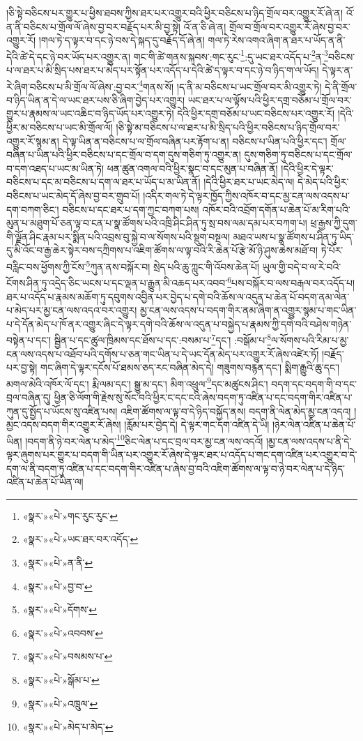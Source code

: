 །ཅི་སྟེ་བཅིངས་པར་གྱུར་པ་ཕྱིས་ཐབས་ཀྱིས་ཐར་པར་འགྱུར་བའི་ཕྱིར་བཅིངས་པ་ཉིད་གྲོལ་བར་འགྱུར་རོ་ཞེ་ན། འོ་ན་ནི་བཅིངས་པ་གྲོལ་ལོ་ཞེས་བྱ་བར་བརྗོད་པར་མི་བྱ་སྟེ། འོ་ན་ཅི་ཞེ་ན། གྲོལ་བ་གྲོལ་བར་འགྱུར་རོ་ཞེས་བྱ་བར་འགྱུར་རོ། །གལ་ཏེ་ད་ལྟར་བ་དང་ཉེ་བས་དེ་སྐད་དུ་བརྗོད་དོ་ཞེ་ན། གལ་ཏེ་རེས་འགའ་ཞིག་ན་ཐར་པ་ཡོད་ན་ནི་དེའི་ཚེ་དེ་དང་ཉེ་བར་ཡོད་པར་འགྱུར་ན། གང་གི་ཚེ་གནས་སྐབས་:གང་རུང་\footnote{«སྣར་»«པེ་»གང་རུང་རུང་}:དུ་ཡང་ཐར་འདོད་པ་\footnote{«སྣར་»«པེ་»ཡང་ཐར་བར་འདོད་}ན་\footnote{«སྣར་»«པེ་»ན་ནི་}བཅིངས་པ་ལ་ཐར་པ་མི་སྲིད་པས་ཐར་པ་མེད་པར་སྟོན་པར་འདོད་པ་དེའི་ཚེ་ད་ལྟར་བ་དང་ཉེ་བ་ཉིད་ག་ལ་ཡོད། དེ་ལྟར་ན་རེ་ཞིག་བཅིངས་པ་མི་གྲོལ་ལོ་ཞེས་:བྱ་བར་\footnote{«སྣར་»«པེ་»བྱ་བ་}གནས་སོ། །ད་ནི་མ་བཅིངས་པ་ཡང་གྲོལ་བར་མི་འགྱུར་ཏེ། དེ་ནི་གྲོལ་བ་ཉིད་ཡིན་ན་དེ་ལ་ཡང་ཐར་པས་ཅི་ཞིག་བྱེད་པར་འགྱུར། ཡང་ཐར་པ་ལ་ལྟོས་པའི་ཕྱིར་དགྲ་བཅོམ་པ་གྲོལ་བར་གྱུར་པ་རྣམས་ལ་ཡང་འཆིང་བ་ཉིད་ཡོད་པར་འགྱུར་ཏེ། དེའི་ཕྱིར་དགྲ་བཅོམ་པ་ཡང་བཅིངས་པར་འགྱུར་རོ། །དེའི་ཕྱིར་མ་བཅིངས་པ་ཡང་མི་གྲོལ་ལོ། །ཅི་སྟེ་མ་བཅིངས་པ་ལ་ཐར་པ་མི་སྲིད་པའི་ཕྱིར་བཅིངས་པ་ཉིད་གྲོལ་བར་འགྱུར་རོ་སྙམ་ན། དེ་ལྟ་ཡིན་ན་བཅིངས་པ་ལ་གྲོལ་བཞིན་པར་རྟོག་པ་ན། བཅིངས་པ་ཡིན་པའི་ཕྱིར་དང་། གྲོལ་བཞིན་པ་ཡིན་པའི་ཕྱིར་བཅིངས་པ་དང་གྲོལ་བ་དག་དུས་གཅིག་ཏུ་འགྱུར་ན། དུས་གཅིག་ཏུ་བཅིངས་པ་དང་གྲོལ་བ་དག་འཐད་པ་ཡང་མ་ཡིན་ཏེ། ཕན་ཚུན་འགལ་བའི་ཕྱིར་སྣང་བ་དང་མུན་པ་བཞིན་ནོ། །དེའི་ཕྱིར་དེ་ལྟར་བཅིངས་པ་དང་མ་བཅིངས་པ་དག་ལ་ཐར་པ་ཡོད་པ་མ་ཡིན་ནོ། །དེའི་ཕྱིར་ཐར་པ་ཡང་མེད་ལ། དེ་མེད་པའི་ཕྱིར་བཅིངས་པ་ཡང་མེད་དོ་ཞེས་བྱ་བར་གྲུབ་པོ། །འདིར་གལ་ཏེ་དེ་ལྟར་ཁྱོད་ཀྱིས་འཁོར་བ་དང་མྱ་ངན་ལས་འདས་པ་དག་བཀག་ཅིང་། བཅིངས་པ་དང་ཐར་པ་དག་ཀྱང་བཀག་པས། འཁོར་བའི་འབྲོག་དགོན་པ་ཆེན་པོ་མ་རིག་པའི་མུན་པ་མཐུག་པོ་ཅན་ལྟ་བ་ངན་པ་སྣ་ཚོགས་པའི་འཁྲི་ཤིང་ཤིན་ཏུ་སྲ་བས་ལམ་དམ་པར་བཀག་པ། ཕྲ་རྒྱས་ཀྱི་དུག་གི་ལྗོན་ཤིང་རྣམ་པར་སྨིན་པའི་འབྲས་བུ་སྐྱེ་བ་ལ་སོགས་པའི་སྡུག་བསྔལ། མཐའ་ཡས་པ་སྣ་ཚོགས་པ་ཤིན་ཏུ་ཡིད་དུ་མི་འོང་བ་རྒྱ་ཆེར་སྟེར་བས་དཀྲིགས་པ་འཇིག་ཚོགས་ལ་ལྟ་བའི་རི་ཆེན་པོ་རྩེ་མོ་ཉི་ཤུས་ཆེས་མཐོ་བ། ཏེ་པོར་བརླིང་བས་ཕྱོགས་ཀྱི་ངོས་\footnote{«སྣར་»«པེ་»དོགས་}ཀུན་ནས་བསྐོར་བ། སྲེད་པའི་ཆུ་ཀླུང་གི་འོབས་ཆེན་པོ། ཡུལ་གྱི་བདེ་བ་ལ་རེ་བའི་ངོགས་ཤིན་ཏུ་འདྲེད་ཅིང་ཡངས་པ་དང་ལྡན་པ་རྒྱུན་མི་འཆད་པར་འབབ་\footnote{«སྣར་»«པེ་»འབབས་}པས་བསྐོར་བ་ལས་བརྒལ་བར་འདོད་པ། ཐར་པ་འདོད་པ་རྣམས་མཆོག་ཏུ་དབུགས་འབྱིན་པར་བྱེད་པ་དགེ་བའི་ཆོས་ལ་འདུན་པ་ཆེན་པོ་བདག་ནམ་ལེན་པ་མེད་པར་མྱ་ངན་ལས་འདའ་བར་འགྱུར། མྱ་ངན་ལས་འདས་པ་བདག་གིར་ནམ་ཞིག་ན་འགྱུར་སྙམ་པ་གང་ཡིན་པ་དེ་དོན་མེད་པ་ཁོ་ནར་འགྱུར་ཞིང་དེ་ལྟར་དགེ་བའི་ཆོས་ལ་འདུན་པ་བསྐྱེད་པ་རྣམས་ཀྱི་དགེ་བའི་བཤེས་གཉེན་བསྟེན་པ་དང་། སྦྱིན་པ་དང་ཚུལ་ཁྲིམས་དང་ཐོས་པ་དང་:བསམ་པ་\footnote{«སྣར་»«པེ་»བསམས་པ་}དང་། :བསྒོམ་པ་\footnote{«སྣར་»«པེ་»སྒོམ་པ་}ལ་སོགས་པའི་རིམ་པ་མྱ་ངན་ལས་འདས་པ་འཐོབ་པའི་དགོས་པ་ཅན་གང་ཡིན་པ་དེ་ཡང་དོན་མེད་པར་འགྱུར་རོ་ཞེས་འཛེར་ཏོ། །བརྗོད་པར་བྱ་སྟེ། གང་ཞིག་དེ་ལྟར་དངོས་པོ་ཐམས་ཅད་རང་བཞིན་མེད་དེ། གཟུགས་བརྙན་དང་། སྨིག་རྒྱུའི་ཆུ་དང་། མགལ་མེའི་འཁོར་ལོ་དང་། རྨི་ལམ་དང་། སྒྱུ་མ་དང་། མིག་འཕྲུལ་\footnote{«སྣར་»«པེ་»འཁྲུལ་}དང་མཚུངས་ཤིང་། བདག་དང་བདག་གི་བ་དང་བྲལ་བཞིན་དུ། ཕྱིན་ཅི་ལོག་གི་རྗེས་སུ་སོང་བའི་ཕྱིར་ང་དང་ངའི་ཞེས་བདག་ཏུ་འཛིན་པ་དང་བདག་གིར་འཛིན་པ་ཀུན་དུ་སྤྱོད་པ་ཡོངས་སུ་འཛིན་པས། འཇིག་ཚོགས་ལ་ལྟ་བ་དེ་ཉིད་བསྐྱོད་ནས། བདག་ནི་ལེན་མེད་མྱ་ངན་འདའ། །མྱང་འདས་བདག་གིར་འགྱུར་རོ་ཞེས། །རློམ་པར་བྱེད་དེ། དེ་ལྟར་གང་དག་འཛིན་དེ་ཡི། །ཉེར་ལེན་འཛིན་པ་ཆེན་པོ་ཡིན། །བདག་ནི་ཉེ་བར་ལེན་པ་མེད་\footnote{«སྣར་»«པེ་»མེད་པ་མེད་}ཅིང་ལེན་པ་དང་བྲལ་བར་མྱ་ངན་ལས་འདའོ། །མྱ་ངན་ལས་འདས་པ་ནི་དེ་ལྟར་ཞུགས་པར་གྱུར་པ་བདག་གི་ཡིན་པར་འགྱུར་རོ་ཞེས་དེ་ལྟར་ཐར་པ་འདོད་པ་གང་དག་འཛིན་པར་འགྱུར་བ་དེ་དག་ལ་ནི་བདག་ཏུ་འཛིན་པ་དང་བདག་གིར་འཛིན་པ་ཞེས་བྱ་བའི་འཇིག་ཚོགས་ལ་ལྟ་བ་ཉེ་བར་ལེན་པ་དེ་ཉིད་འཛིན་པ་ཆེན་པོ་ཡིན་ལ། 